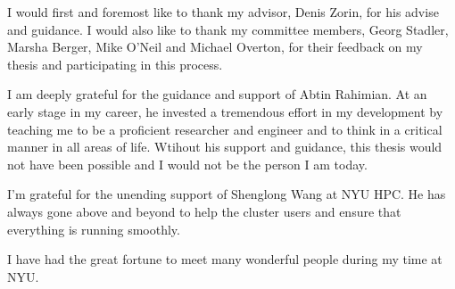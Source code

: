 I would first and foremost like to thank my advisor, Denis Zorin, for his advise and guidance. I would also like to thank my committee members, Georg Stadler, Marsha Berger, Mike O'Neil and Michael Overton, for their feedback on my thesis and participating in this process.

I am deeply grateful for the guidance and support of Abtin Rahimian.
At an early stage in my career, he invested a tremendous effort in my development by teaching me to be a proficient researcher and engineer and to think in a critical manner in all areas of life.
Wtihout his support and guidance, this thesis would not have been possible and I would not be the person I am today.

I'm grateful for the unending support of Shenglong Wang at NYU HPC. 
He has always gone above and beyond to help the cluster users and ensure that everything is running smoothly.

I have had the great fortune to meet many wonderful people during my time at NYU.

